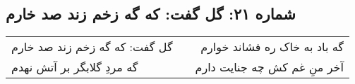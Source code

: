 \begin{center}
\section*{شماره ۲۱: گل گفت: که گه زخم زند صد خارم}
\label{sec:021}
\begin{longtable}{l p{0.5cm} r}
گل گفت: که گه زخم زند صد خارم
&&
گه باد به خاک ره فشاند خوارم
\\
گه مردِ گلابگر بر آتش نهدم
&&
آخر منِ غم کش چه جنایت دارم
\\
\end{longtable}
\end{center}
